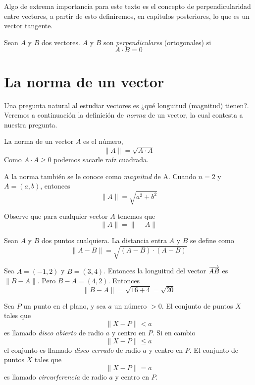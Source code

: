 Algo de extrema importancia para este texto es el concepto de perpendicularidad entre vectores, a partir
de esto definiremos, en capítulos posteriores, lo que es un vector tangente.

\begin{definition}
    Sean $A$ y $B$ dos vectores. $A$ y $B$ son \emph{perpendiculares} (ortogonales) si
    $$ A \cdot B = 0 $$
\end{definition}

\section{La norma de un vector}

Una pregunta natural al estudiar vectores es ¿qué longuitud (magnitud) tienen?. Veremos a continuación
la definición de \emph{norma} de un vector, la cual contesta a nuestra pregunta.

\begin{definition}
    La norma de un vector $A$ es el número,
    $$ \| A \| = \sqrt{A \cdot A} $$
    Como $A \cdot A \ge 0$ podemos sacarle raíz cuadrada. 
\end{definition}

A la norma también se le conoce como \emph{magnitud} de A. Cuando $n=2$ y $A = (a,b)$, entonces
    $$ \| A \| = \sqrt{a^{2} + b^{2}} $$

Observe que para cualquier vector $A$ tenemos que 
$$ \| A \| = \| -A \| $$

\begin{definition}
    Sean $A$ y $B$ dos puntos cualquiera. La distancia entra $A$ y $B$ se define como
    $$ \| A - B \| = \sqrt{(A-B) \cdot (A-B)} $$
\end{definition}

\begin{myExample}
    Sea $A = (-1,2)$ y $B = (3,4)$. Entonces la longuitud del vector $\overrightarrow{AB}$ es $\|B-A\|$. Pero
    $B-A = (4,2)$. Entonces
    $$\|B-A\| = \sqrt{16+4} = \sqrt{20} $$
\end{myExample}

Sea $P$ un punto en el plano, y sea $a$ un número $> 0$. El conjunto de puntos $X$ tales que
$$ \| X - P \| < a $$
es llamado \emph{disco abierto} de radio $a$ y centro en $P$. Si en cambio
$$ \| X - P \| \le a $$
el conjunto es llamado \emph{disco cerrado} de radio $a$ y centro en $P$. El conjunto de puntos
$X$ tales que
$$ \| X - P \| = a $$
es llamado \emph{circurferencia} de radio $a$ y centro en $P$.

